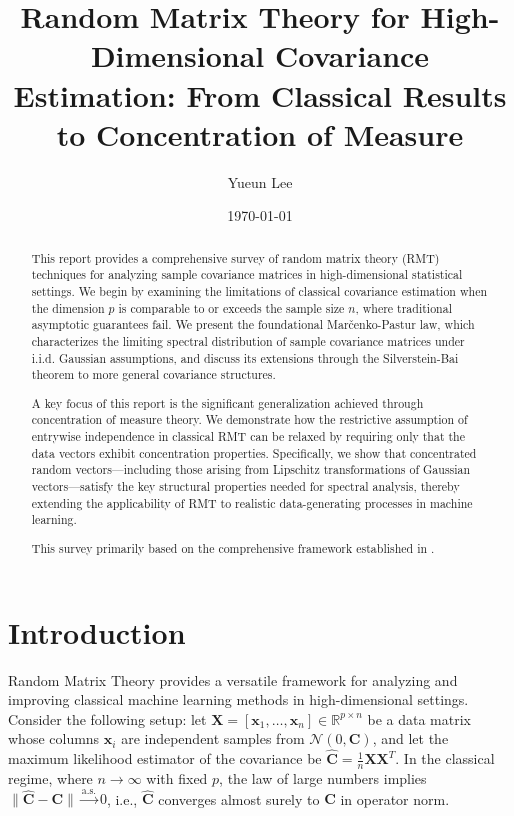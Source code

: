 \documentclass[12pt]{article}
\title{Random Matrix Theory for High-Dimensional Covariance Estimation: From Classical Results to Concentration of Measure}
\author{Yueun Lee}
\affil{Department of Statistics, Seoul National University}
\date{\today}
\begin{document}
\maketitle

\begin{abstract}
This report provides a comprehensive survey of random matrix theory (RMT) techniques for analyzing sample covariance matrices in high-dimensional statistical settings. We begin by examining the limitations of classical covariance estimation when the dimension $p$ is comparable to or exceeds the sample size $n$, where traditional asymptotic guarantees fail. We present the foundational Marčenko-Pastur law, which characterizes the limiting spectral distribution of sample covariance matrices under i.i.d. Gaussian assumptions, and discuss its extensions through the Silverstein-Bai theorem to more general covariance structures.

A key focus of this report is the significant generalization achieved through concentration of measure theory. We demonstrate how the restrictive assumption of entrywise independence in classical RMT can be relaxed by requiring only that the data vectors exhibit concentration properties. Specifically, we show that concentrated random vectors—including those arising from Lipschitz transformations of Gaussian vectors—satisfy the key structural properties needed for spectral analysis, thereby extending the applicability of RMT to realistic data-generating processes in machine learning.

This survey primarily based on the comprehensive framework established in \citep{couillet2022random}.
\end{abstract}

\newpage
\tableofcontents

\newpage
\section{Introduction}
Random Matrix Theory provides a versatile framework for analyzing and improving classical machine learning methods in high-dimensional settings. Consider the following setup: let $\mathbf{X} = [\mathbf{x}_1, \dots, \mathbf{x}_n] \in \mathbb{R}^{p \times n}$ be a data matrix whose columns $\mathbf{x}_i$ are independent samples from $\mathcal{N}(0, \mathbf{C})$, and let the maximum likelihood estimator of the covariance be $\hat{\mathbf{C}} = \frac{1}{n}\mathbf{X}\mathbf{X}^T$. In the classical regime, where $n \to \infty$ with fixed $p$, the law of large numbers implies $\|\hat{\mathbf{C}} - \mathbf{C}\| \xrightarrow{\mathrm{a.s.}} 0$, i.e., $\hat{\mathbf{C}}$ converges almost surely to $\mathbf{C}$ in operator norm.
\end{document}
